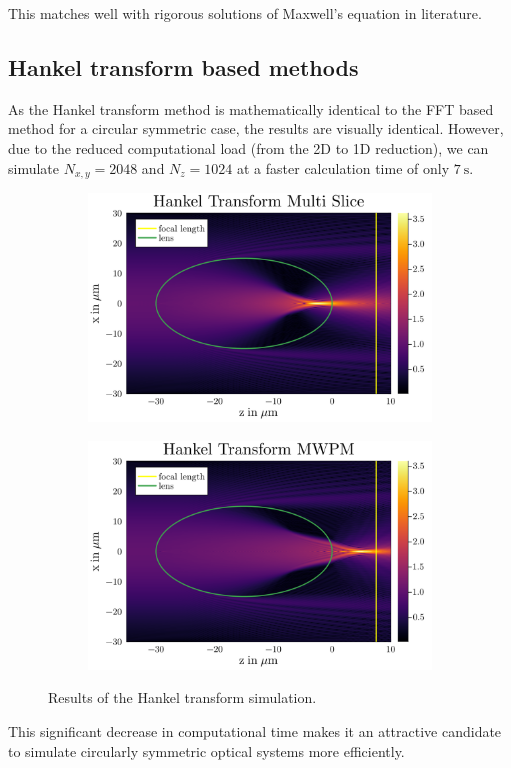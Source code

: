 \documentclass[a4paper,12pt]{article}
\begin{document}
This matches well with rigorous solutions of Maxwell's equation in literature. 

\subsection{Hankel transform based methods}
As the Hankel transform method is mathematically identical to the FFT based method for a circular symmetric case, the results are visually identical.
However, due to the reduced computational load (from the 2D to 1D reduction), we can simulate $N_{x,y} = 2048$ and $N_z=1024$ at a faster calculation time of only $\SI{7}{\second}$. 
\begin{figure}[H]
    \centering
    \begin{subfigure}[]{0.5\textwidth}
        \centering
        \includegraphics[width=\textwidth]{../figures/Hankel_normal.svg.png} 
    \end{subfigure}%
    \begin{subfigure}[]{0.5\textwidth}
        \centering
        \includegraphics[width=\textwidth]{../figures/Hankel_MWPM.svg.png} 
    \end{subfigure}
    \caption{Results of the Hankel transform simulation.}
    \label{fig:}
\end{figure}
This significant decrease in computational time makes it an attractive candidate
to simulate circularly symmetric optical systems more efficiently.
\end{document}
